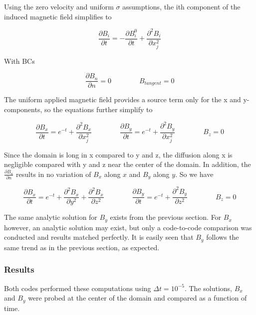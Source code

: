 \documentclass[11pt]{article}
\begin{document}
Using the zero velocity and uniform $\sigma$ assumptions, the ith component of the induced magnetic field simplifies to

\begin{equation}
	\frac{\partial B_i}{\partial t} 
	=
	-
	\frac{\partial B_i^0}{\partial t}
	+
	\frac{\partial^2 B_i}{\partial x_j^2} 
\end{equation}

With BCs

\begin{equation}
	\frac{\partial B_{n}}{\partial n} = 0
	\qquad \qquad
	B_{tangent} = 0
\end{equation}

The uniform applied magnetic field provides a source term only for the x and y-components, so the equations further simplify to

\begin{equation}
	\frac{\partial B_x}{\partial t} 
	=
	e^{-t}
	+
	\frac{\partial^2 B_x}{\partial x_j^2} 
	\qquad \qquad
	\frac{\partial B_y}{\partial t} 
	=
	e^{-t}
	+
	\frac{\partial^2 B_y}{\partial x_j^2} 
	\qquad \qquad
	B_z = 0
\end{equation}

Since the domain is long in x compared to y and z, the diffusion along x is negligible compared with y and z near the center of the domain. In addition, the $\frac{\partial B_n}{\partial n}$ results in no variation of $B_x$ along $x$ and $B_y$ along $y$. So we have

\begin{equation}
	\frac{\partial B_x}{\partial t} 
	=
	e^{-t}
	+
	\frac{\partial^2 B_x}{\partial y^2} 
	+
	\frac{\partial^2 B_x}{\partial z^2} 
	\qquad \qquad
	\frac{\partial B_y}{\partial t} 
	=
	e^{-t}
	+
	\frac{\partial^2 B_y}{\partial z^2} 
	\qquad \qquad
	B_z = 0
\end{equation}

The same analytic solution for $B_y$ exists from the previous section. For $B_x$ however, an analytic solution may exist, but only a code-to-code comparison was conducted and results matched perfectly. It is easily seen that $B_y$ follows the same trend as in the previous section, as expected.

\subsubsection{Results}
Both codes performed these computations using $\Delta t = 10^{-5}$. The solutions, $B_x$ and $B_y$ were probed at the center of the domain and compared as a function of time.
\end{document}
